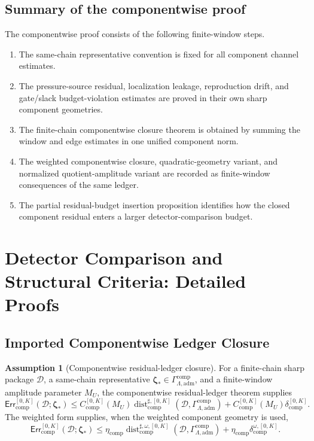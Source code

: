 \documentclass[11pt]{article}
\numberwithin{equation}{section}
\theoremstyle{definition}
\newtheorem{assumption}[assumption]{Assumption}
\theoremstyle{remark}
\newcommand{\adm}{\mathrm{adm}}
\newcommand{\comp}{\mathrm{comp}}
\newcommand{\Err}{\mathsf{Err}}
\newcommand{\Dist}{\operatorname{dist}}
\newcommand{\calD}{\mathcal D}
\newcommand{\bzeta}{\boldsymbol\zeta}
\newcommand{\Gcomp}{\Gamma_{\Lambda,\adm}^{\comp}}
\begin{document}
\subsection{Summary of the componentwise proof}
\label{comp:sec:proof-summary}

The componentwise proof consists of the following finite-window steps.
\begin{enumerate}[label=\textbf{Step \arabic*.},leftmargin=*]
    \item The same-chain representative convention is fixed for all component
    channel estimates.
    \item The pressure-source residual, localization leakage, reproduction
    drift, and gate/slack budget-violation estimates are proved in their own
    sharp component geometries.
    \item The finite-chain componentwise closure theorem is obtained by summing
    the window and edge estimates in one unified component norm.
    \item The weighted componentwise closure, quadratic-geometry variant, and
    normalized quotient-amplitude variant are recorded as finite-window
    consequences of the same ledger.
    \item The partial residual-budget insertion proposition identifies how the
    closed component residual enters a larger detector-comparison budget.
\end{enumerate}

\section{Detector Comparison and Structural Criteria: Detailed Proofs}\label{app:detector-details}
\subsection{Imported Componentwise Ledger Closure}
\label{sec:imported-ledger}

\begin{assumption}[Componentwise residual-ledger closure]
\label{ass:component-ledger}
For a finite-chain sharp package \(\calD\), a same-chain representative
\(\bzeta_*\in\Gcomp\), and a finite-window amplitude parameter \(M_U\), the
componentwise residual-ledger theorem supplies
\[
    \Err_{\comp}^{[0,K]}(\calD;\bzeta_*)
    \le
    C_{\comp}^{[0,K]}(M_U)
    \Dist_{\comp}^{\sharp,[0,K]}(\calD,\Gcomp)
    +
    C_{\comp}^{[0,K]}(M_U)
    \delta_{\comp}^{[0,K]}.
\]
The weighted form supplies, when the weighted component geometry is used,
\[
    \Err_{\comp}^{[0,K]}(\calD;\bzeta_*)
    \le
    \eta_{\comp}
    \Dist_{\comp}^{\sharp,\omega,[0,K]}(\calD,\Gcomp)
    +
    \eta_{\comp}
    \delta_{\comp}^{\omega,[0,K]}.
\]
\end{assumption}
\end{document}
